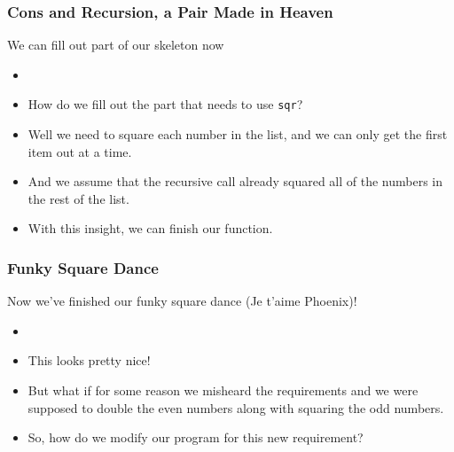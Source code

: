 \documentclass{beamer}
\begin{document}


\begin{frame}
  \frametitle{Cons and Recursion, a Pair Made in Heaven}
  We can fill out part of our skeleton now
  \begin{itemize}
  \item<2-> \fillOne
  \item<3-> How do we fill out the part that needs to use \texttt{sqr}?
  \item<4-> Well we need to square each number in the list, and we can only
    get the first item out at a time.
  \item<5-> And we assume that the recursive call already squared all of the
    numbers in the rest of the list.
  \item<6-> With this insight, we can finish our function.
  \end{itemize}
\end{frame}

\begin{frame}
  \frametitle{Funky Square Dance}
  Now we've finished our funky square dance (Je t'aime Phoenix)!
  \begin{itemize}
  \item<2-> \squareEachFinal
  \item<3-> This looks pretty nice!
  \item<4-> But what if for some reason we misheard the requirements and we
    were supposed to double the even numbers along with squaring the odd numbers.
  \item<5-> So, how do we modify our program for this new requirement?
  \end{itemize}
\end{frame}

\end{document}
